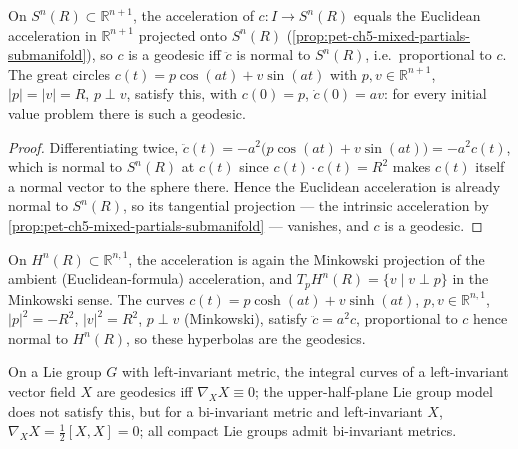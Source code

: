 \begin{example}
  \label{ex:pet-ch5-sphere-great-circles}
  On $S^n(R)\subset\mathbb R^{n+1}$, the acceleration of $c:I\to S^n(R)$ equals the
  Euclidean acceleration in $\mathbb R^{n+1}$ projected onto $S^n(R)$
  (\cref{prop:pet-ch5-mixed-partials-submanifold}), so $c$ is a geodesic iff $\ddot c$
  is normal to $S^n(R)$, i.e.\ proportional to $c$. The great circles
  $c(t)=p\cos(at)+v\sin(at)$ with $p,v\in\mathbb R^{n+1}$, $|p|=|v|=R$, $p\perp v$,
  satisfy this, with $c(0)=p$, $\dot c(0)=av$: for every initial value problem there
  is such a geodesic.
\end{example}
\begin{proof}
  Differentiating twice, $\ddot c(t)=-a^2\big(p\cos(at)+v\sin(at)\big)=-a^2c(t)$,
  which is normal to $S^n(R)$ at $c(t)$ since $c(t)\cdot c(t)=R^2$ makes $c(t)$
  itself a normal vector to the sphere there. Hence the Euclidean acceleration is
  already normal to $S^n(R)$, so its tangential projection — the intrinsic
  acceleration by \cref{prop:pet-ch5-mixed-partials-submanifold} — vanishes, and $c$
  is a geodesic.
\end{proof}

\begin{example}
  \label{ex:pet-ch5-hyperbolic-hyperbolas}
  On $H^n(R)\subset\mathbb R^{n,1}$, the acceleration is again the Minkowski
  projection of the ambient (Euclidean-formula) acceleration, and
  $T_pH^n(R)=\{v\mid v\perp p\}$ in the Minkowski sense. The curves
  $c(t)=p\cosh(at)+v\sinh(at)$, $p,v\in\mathbb R^{n,1}$, $|p|^2=-R^2$, $|v|^2=R^2$,
  $p\perp v$ (Minkowski), satisfy $\ddot c=a^2c$, proportional to $c$ hence normal to
  $H^n(R)$, so these hyperbolas are the geodesics.
\end{example}

\begin{example}
  \label{ex:pet-ch5-lie-group-geodesics}
  On a Lie group $G$ with left-invariant metric, the integral curves of a
  left-invariant vector field $X$ are geodesics iff $\nabla_XX\equiv0$; the
  upper-half-plane Lie group model does not satisfy this, but for a bi-invariant
  metric and left-invariant $X$, $\nabla_XX=\tfrac12[X,X]=0$; all compact Lie groups
  admit bi-invariant metrics.
\end{example}

